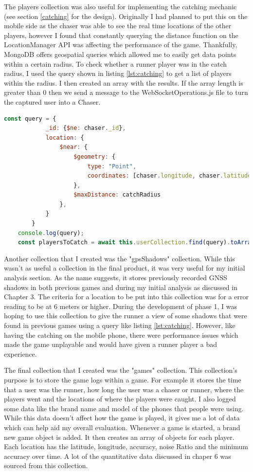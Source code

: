 \documentclass{l4proj}
\begin{document}
The players collection was also useful for implementing the catching mechanic (see section \ref{catching} for the design). Originally I had planned to put this on the mobile side
as the chaser was able to see the real time locations of the other players, however I found that constantly querying the distance function
on the LocationManager API was affecting the performance of the game. Thankfully, MongoDB offers geospatial queries which allowed me to
easily get data points within a certain radius. To check whether a runner player was in the catch radius, I used the query shown in
listing \ref{lst:catching} to get a list of players within the radius. I then created an array with the results. If the array length is greater
than 0 then we send a message to the WebSocketOperations.js file to turn the captured user into a Chaser.

\begin{lstlisting}[language=javascript, float, caption={The Geospatial query used to implement the catching mechanic. The \$ne key is the way to make a not equals query.}, label=lst:catching]
    const query = {
            _id: {$ne: chaser._id},
            location: {
                $near: {
                    $geometry: {
                        type: "Point",
                        coordinates: [chaser.longitude, chaser.latitude]
                    },
                    $maxDistance: catchRadius
                },
            }
        }
    console.log(query);
    const playersToCatch = await this.userCollection.find(query).toArray();
\end{lstlisting}

Another collection that I created was the "gpsShadows" collection. While this wasn't as useful a collection in the final product, 
it was very useful for my initial analysis section. As the name suggests, it stores previously recorded GNSS shadows in both previous
games and during my initial analysis as discussed in Chapter 3. The criteria for a location to be put into this collection was for
a error reading to be at 6 meters or higher. During the development of phase 1, I was hoping to use this collection to give the runner
a view of some shadows that were found in previous games using a query like listing \ref{lst:catching}. However, like having the catching
on the mobile phone, there were performance issues which made the game unplayable and would have given a runner player a bad experience.

The final collection that I created was the "games" collection. This collection's purpose is to store the game logs within a game. For example
it stores the time that a user was the runner, how long the user was a chaser or runner, where the players went and the locations of where the
players were caught. I also logged some data like the brand name and model of the phones that people were using. While this data doesn't affect
how the game is played, it gives me a lot of data which can help aid my overall evaluation. Whenever a game is started, a brand new game object
is added. It then creates an array of objects for each player. Each location has the latitude, longitude, accuracy, noise Ratio and the minimum
accuracy over time. A lot of the quantitative data discussed in chaper 6 was sourced from this collection.
\end{document}
